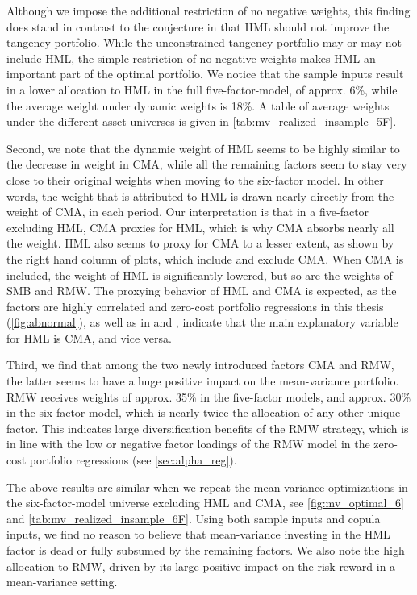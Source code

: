 Although we impose the additional restriction of no negative weights, this finding does stand in contrast to the conjecture in \textcite{FF2015} that HML should not improve the tangency portfolio. While the unconstrained tangency portfolio may or may not include HML, the simple restriction of no negative weights makes HML an important part of the optimal portfolio. We notice that the sample inputs result in a lower allocation to HML in the full five-factor-model, of approx. 6\%, while the average weight under dynamic weights is 18\%. A table of average weights under the different asset universes is given in \autoref{tab:mv_realized_insample_5F}.

Second, we note that the dynamic weight of HML seems to be highly similar to the decrease in weight in CMA, while all the remaining factors seem to stay very close to their original weights when moving to the six-factor model. In other words, the weight that is attributed to HML is drawn nearly directly from the weight of CMA, in each period. Our interpretation is that in a five-factor excluding HML, CMA proxies for HML, which is why CMA absorbs nearly all the weight. HML also seems to proxy for CMA to a lesser extent, as shown by the right hand column of plots, which include and exclude CMA. When CMA is included, the weight of HML is significantly lowered, but so are the weights of SMB and RMW. The proxying behavior of HML and CMA is expected, as the factors are highly correlated and zero-cost portfolio regressions in this thesis (\autoref{fig:abnormal}), as well as in \textcite{FF2015} and \textcite{Asness2015}, indicate that the main explanatory variable for HML is CMA, and vice versa.

Third, we find that among the two newly introduced factors CMA and RMW, the latter seems to have a huge positive impact on the mean-variance portfolio. RMW receives weights of approx. 35\% in the five-factor models, and approx. 30\% in the six-factor model, which is nearly twice the allocation of any other unique factor. This indicates large diversification benefits of the RMW strategy, which is in line with the low or negative factor loadings of the RMW model in the zero-cost portfolio regressions (see \autoref{sec:alpha_reg}).

The above results are similar when we repeat the mean-variance optimizations in the six-factor-model universe excluding HML and CMA, see \autoref{fig:mv_optimal_6} and \autoref{tab:mv_realized_insample_6F}. Using both sample inputs and copula inputs, we find no reason to believe that mean-variance investing in the HML factor is dead or fully subsumed by the remaining factors. We also note the high allocation to RMW, driven by its large positive impact on the risk-reward in a mean-variance setting. 

